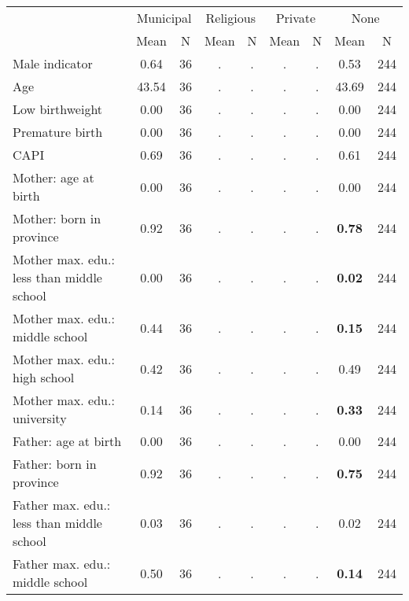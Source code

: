 \begin{tabular}{l c c c c c c c c}
\toprule
& \multicolumn{2}{c}{Municipal} & \multicolumn{2}{c}{Religious} & \multicolumn{2}{c}{Private} & \multicolumn{2}{c}{None} \\
& \scriptsize Mean & \scriptsize N & \scriptsize Mean & \scriptsize N & \scriptsize Mean & \scriptsize N & \scriptsize Mean & \scriptsize N \\
\midrule
Male indicator &      0.64 &        36 &         . & . &         . & . &      0.53 &       244 \\
Age &     43.54 &        36 &         . & . &         . & . &     43.69 &       244 \\
Low birthweight &      0.00 &        36 &         . & . &         . & . &      0.00 &       244 \\
Premature birth &      0.00 &        36 &         . & . &         . & . &      0.00 &       244 \\
CAPI &      0.69 &        36 &         . & . &         . & . &      0.61 &       244 \\
Mother: age at birth &      0.00 &        36 &         . & . &         . & . &      0.00 &       244 \\
Mother: born in province &      0.92 &        36 &         . & . &         . & . & \textbf{     0.78} &       244 \\
Mother max. edu.: less than middle school &      0.00 &        36 &         . & . &         . & . & \textbf{     0.02} &       244 \\
Mother max. edu.: middle school &      0.44 &        36 &         . & . &         . & . & \textbf{     0.15} &       244 \\
Mother max. edu.: high school &      0.42 &        36 &         . & . &         . & . &      0.49 &       244 \\
Mother max. edu.: university &      0.14 &        36 &         . & . &         . & . & \textbf{     0.33} &       244 \\
Father: age at birth &      0.00 &        36 &         . & . &         . & . &      0.00 &       244 \\
Father: born in province &      0.92 &        36 &         . & . &         . & . & \textbf{     0.75} &       244 \\
Father max. edu.: less than middle school &      0.03 &        36 &         . & . &         . & . &      0.02 &       244 \\
Father max. edu.: middle school &      0.50 &        36 &         . & . &         . & . & \textbf{     0.14} &       244 \\

\end{tabular}
